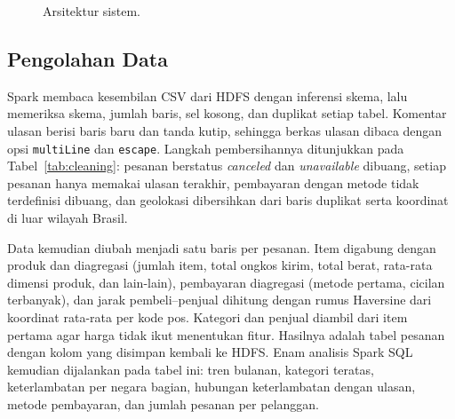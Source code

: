 \documentclass[11pt,a4paper]{article}
\newcommand{\tabel}[3]{%
  \begin{table}[tbp]\centering\caption{#2}\label{#3}\small\adjustbox{max width=\textwidth}{}\end{table}}
\newcommand{\f}[1]{\texttt{#1}}
\begin{document}
\begin{figure}[tbp]
\centering
{}
\caption{Arsitektur sistem.}
\label{fig:arsitektur}
\end{figure}

\subsection{Pengolahan Data}
Spark membaca kesembilan CSV dari HDFS dengan inferensi skema, lalu memeriksa skema,
jumlah baris, sel kosong, dan duplikat setiap tabel. Komentar ulasan berisi baris baru
dan tanda kutip, sehingga berkas ulasan dibaca dengan opsi \f{multiLine} dan
\f{escape}. Langkah pembersihannya ditunjukkan pada Tabel~\ref{tab:cleaning}: pesanan
berstatus \emph{canceled} dan \emph{unavailable} dibuang, setiap pesanan hanya memakai
ulasan terakhir, pembayaran dengan metode tidak terdefinisi dibuang, dan geolokasi
dibersihkan dari baris duplikat serta koordinat di luar wilayah Brasil.
\tabel{cleaning}{Langkah pembersihan data.}{tab:cleaning}

Data kemudian diubah menjadi satu baris per pesanan. Item digabung dengan produk dan
diagregasi (jumlah item, total ongkos kirim, total berat, rata-rata dimensi produk,
dan lain-lain), pembayaran diagregasi (metode pertama, cicilan terbanyak), dan jarak
pembeli--penjual dihitung dengan rumus Haversine dari koordinat rata-rata per kode pos.
Kategori dan penjual diambil dari item pertama agar harga tidak ikut menentukan fitur.
Hasilnya adalah tabel \nOrders{} pesanan dengan \curatedColumns{} kolom yang disimpan
kembali ke HDFS. Enam analisis Spark SQL kemudian dijalankan pada tabel ini: tren
bulanan, kategori teratas, keterlambatan per negara bagian, hubungan keterlambatan dengan
ulasan, metode pembayaran, dan jumlah pesanan per pelanggan.
\end{document}
